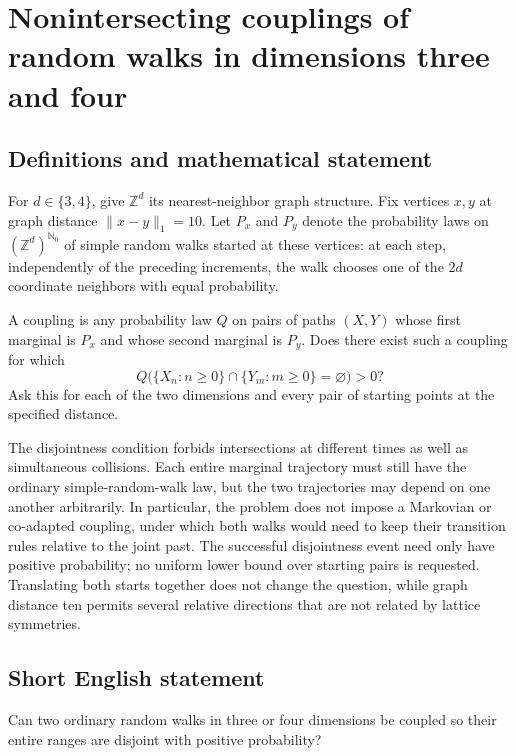 \documentclass[11pt,a4paper]{article}
\begin{document}
\section*{Nonintersecting couplings of random walks in dimensions three and four}\label{statement}

\subsection{Definitions and mathematical statement}
For $d\in\{3,4\}$, give $\mathbb Z^d$ its nearest-neighbor graph structure. Fix vertices $x,y$ at graph distance $\|x-y\|_1=10$. Let $P_x$ and $P_y$ denote the probability laws on $(\mathbb Z^d)^{\mathbb N_0}$ of simple random walks started at these vertices: at each step, independently of the preceding increments, the walk chooses one of the $2d$ coordinate neighbors with equal probability.

A coupling is any probability law $Q$ on pairs of paths $(X,Y)$ whose first marginal is $P_x$ and whose second marginal is $P_y$. Does there exist such a coupling for which
\[
Q\bigl(\{X_n:n\ge0\}\cap\{Y_m:m\ge0\}=\varnothing\bigr)>0?
\]
Ask this for each of the two dimensions and every pair of starting points at the specified distance.

The disjointness condition forbids intersections at different times as well as simultaneous collisions. Each entire marginal trajectory must still have the ordinary simple-random-walk law, but the two trajectories may depend on one another arbitrarily. In particular, the problem does not impose a Markovian or co-adapted coupling, under which both walks would need to keep their transition rules relative to the joint past. The successful disjointness event need only have positive probability; no uniform lower bound over starting pairs is requested. Translating both starts together does not change the question, while graph distance ten permits several relative directions that are not related by lattice symmetries.
\subsection{Short English statement}
Can two ordinary random walks in three or four dimensions be coupled so their entire ranges are disjoint with positive probability?
\end{document}
